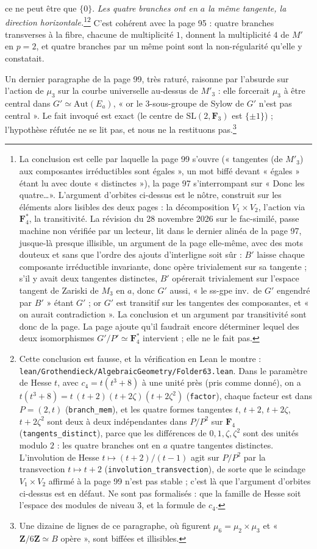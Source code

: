 \documentclass[11pt,a4paper]{article}
\begin{document}
ce ne peut être que $\{0\}$. \emph{Les quatre branches ont en $a$ la même
tangente, la direction horizontale.}\footnote{La conclusion est celle par
laquelle la page 99 s'ouvre (« tangentes (de $M'_3$) aux composantes
irréductibles sont égales », un mot biffé devant « égales » étant lu avec
doute « distinctes »), la page 97 s'interrompant sur « Donc les
quatre\ldots ». L'argument
d'orbites ci-dessus est le nôtre, construit sur les éléments alors lisibles des
deux pages : la décomposition $V_1 \times V_2$, l'action via
$\mathbf{F}_4^{*}$, la transitivité. La révision du 28 novembre 2026 sur le
fac-similé, passe machine non vérifiée par un lecteur, lit dans le dernier
alinéa de la page 97, jusque-là presque illisible, un argument de la page
elle-même, avec des mots douteux et sans que l'ordre des ajouts d'interligne
soit sûr : $B'$ laisse chaque composante irréductible invariante, donc opère
trivialement sur sa tangente ; s'il y avait deux tangentes distinctes, $B'$
opérerait trivialement sur l'espace tangent de Zariski de $M_3$ en $a$, donc
$G'$ aussi, « le ss-gpe inv.\ de $G'$ engendré par $B'$ » étant $G'$ ; or $G'$
est transitif sur les tangentes des composantes, et « on aurait
contradiction ». La conclusion et un argument par transitivité sont donc de la
page. La page ajoute qu'il faudrait encore déterminer lequel des deux
isomorphismes $G'/P' \simeq \mathbf{F}_4^{*}$ intervient ; elle ne le fait
pas.}\footnote{Cette conclusion est fausse, et la vérification en Lean le
montre : \texttt{lean/Grothendieck/AlgebraicGeometry/Folder63.lean}. Dans le paramètre de Hesse
$t$, avec $c_4 = t(t^3 + 8)$ à une unité près (pris comme donné), on a
$t(t^3+8) = t\,(t+2)(t+2\zeta)(t+2\zeta^2)$ (\texttt{factor}), chaque facteur
est dans $P = (2, t)$ (\texttt{branch\_mem}), et les quatre formes tangentes
$t$, $t+2$, $t+2\zeta$, $t+2\zeta^2$ sont deux à deux indépendantes dans
$P/P^2$ sur $\mathbf{F}_4$ (\texttt{tangents\_distinct}), parce que les
différences de $0, 1, \zeta, \zeta^2$ sont des unités modulo $2$ : les quatre
branches ont en $a$ quatre tangentes distinctes. L'involution de Hesse
$t \mapsto (t+2)/(t-1)$ agit sur $P/P^2$ par la transvection
$t \mapsto t+2$ (\texttt{involution\_transvection}), de sorte que le
scindage $V_1 \times V_2$ affirmé à la page 99 n'est pas stable ; c'est là que
l'argument d'orbites ci-dessus est en défaut. Ne sont pas formalisés : que la
famille de Hesse soit l'espace des modules de niveau $3$, et la formule de
$c_4$.} C'est cohérent avec la page 95 : quatre branches transverses à la fibre,
chacune de multiplicité $1$, donnent la multiplicité $4$ de $M'$ en $p = 2$,
et quatre branches par un même point sont la non-régularité qu'elle y
constatait.

Un dernier paragraphe de la page 99, très raturé, raisonne par l'absurde sur
l'action de $\mu_3$ sur la courbe universelle au-dessus de $M'_3$ : elle
forcerait $\mu_3$ à être central dans $G' \simeq \mathrm{Aut}(E_a)$, « or le
$3$-sous-groupe de Sylow de $G'$ n'est pas central ». Le fait invoqué est
exact (le centre de $\mathrm{SL}(2,\mathbf{F}_3)$ est $\{\pm 1\}$) ; l'hypothèse
réfutée ne se lit pas, et nous ne la restituons pas.\footnote{Une dizaine de
lignes de ce paragraphe, où figurent $\mu_6 = \mu_2\times\mu_3$ et
« $\mathbf{Z}/6\mathbf{Z} \simeq B$ opère », sont biffées et illisibles.}
\end{document}
